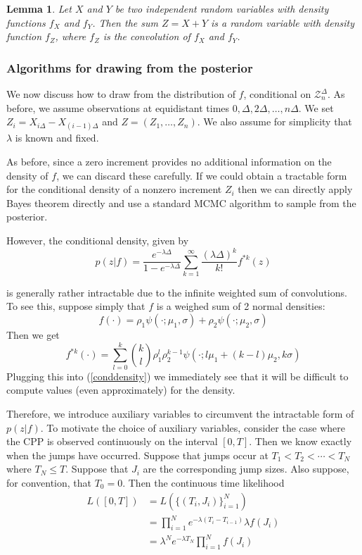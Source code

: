 \documentclass[a4paper,11pt]{article}
\theoremstyle{theorem}
\newtheorem{lem}{Lemma}[section]
\theoremstyle{definition}
\begin{document}
\begin{lem}
Let $X$ and $Y$ be two independent random variables with density
functions $f_{X}$ and $f_{Y}$. Then the sum $Z = X + Y$ is a random variable with density function $f_{Z}$, where $f_Z$ is the convolution of $f_X$ and $f_Y$. 
\end{lem}

\subsubsection{Algorithms for drawing from the posterior}

We now discuss how to draw  from the distribution of $f$, conditional on $\mathcal{Z}_{n}^{\Delta}$. As before, we assume observations at equidistant times $0, \Delta, 2\Delta, \dotsc, n\Delta$.  We set $Z_i = X_{i\Delta} - X_{(i-1)\Delta}$ and $Z = (Z_1, \dotsc, Z_n)$. We also assume for simplicity that $\lambda$ is known and fixed.

As before, since a zero increment provides no additional information on the density of $f$, we can discard these carefully. If we could obtain a tractable form for the conditional density of a nonzero increment $Z_i$ then we can directly apply Bayes theorem directly and use a standard MCMC algorithm to sample from the posterior.

However, the conditional density, given by
\begin{equation} \label{conddensity}
p(z | f) = \frac{e^{-\lambda \Delta}}{1- e^{-\lambda \Delta}}\sum_{k=1}^{\infty}{\frac{(\lambda \Delta)^k}{k!}f^{\ast k}(z)}
\end{equation}


is generally rather intractable due to the infinite weighted sum of convolutions. To see this, suppose simply that $f$ is a weighed sum of 2 normal densities:
\[
f(\cdot) = \rho_1 \psi(\cdot; \mu_1, \sigma) + \rho_2 \psi(\cdot; \mu_2, \sigma)
\]
Then we get
\[
f^{\ast k}(\cdot) = \sum_{l=0}^{k}{\binom{k}{l} \rho_{1}^{l}\rho_{2}^{k-1}\psi(\cdot; l\mu_1 + (k-l)\mu_2, k\sigma)}
\]
Plugging this into (\ref{conddensity}) we immediately see that it will be difficult to compute values (even approximately) for the density.

Therefore, we introduce auxiliary variables to circumvent the intractable form of $p(z | f)$. To motivate the choice of auxiliary variables, consider the case where the CPP is observed continuously on the interval $[0, T]$.
Then we know exactly when the jumps have occurred. Suppose that jumps occur at $T_1 < T_2 < \dotsb < T_N$ where $T_N \leq T$. Suppose that $J_i$ are the corresponding jump sizes. Also suppose, for convention, that $T_0 = 0$. Then the continuous time likelihood
\begin{align*}
L([0, T]) &= L(\{(T_i, J_i)\}_{i=1}^{N}) \\
&= \prod_{i=1}^{N}{e^{-\lambda (T_i  - T_{i-1})}\lambda f(J_i)} \\
&= \lambda^N e^{-\lambda T_N} \prod_{i=1}^{N}{f(J_i)}
\end{align*}
\end{document}
